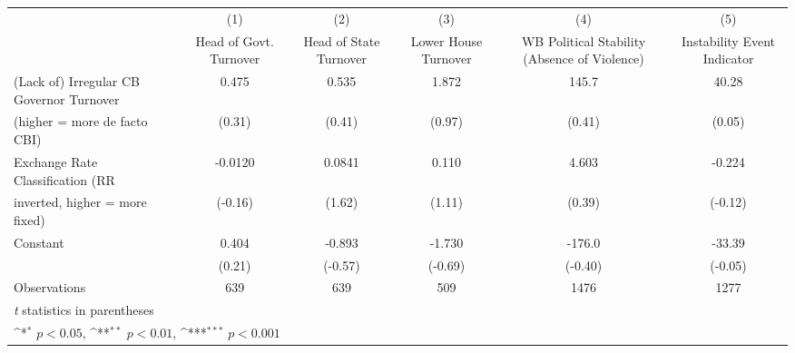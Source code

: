 {
\def\sym#1{\ifmmode^{#1}\else\(^{#1}\)\fi}
\begin{tabular}{l*{5}{c}}
\toprule
                                        &\multicolumn{1}{c}{(1)}&\multicolumn{1}{c}{(2)}&\multicolumn{1}{c}{(3)}&\multicolumn{1}{c}{(4)}&\multicolumn{1}{c}{(5)}\\
                                        &\multicolumn{1}{c}{Head of Govt. Turnover}&\multicolumn{1}{c}{Head of State Turnover}&\multicolumn{1}{c}{Lower House Turnover}&\multicolumn{1}{c}{WB Political Stability (Absence of Violence)}&\multicolumn{1}{c}{Instability Event Indicator}\\
\midrule
(Lack of) Irregular CB Governor Turnover&     0.475         &     0.535         &     1.872         &     145.7         &     40.28         \\
(higher = more de facto CBI)            &    (0.31)         &    (0.41)         &    (0.97)         &    (0.41)         &    (0.05)         \\
\addlinespace
Exchange Rate Classification (RR        &   -0.0120         &    0.0841         &     0.110         &     4.603         &    -0.224         \\
inverted, higher = more fixed)          &   (-0.16)         &    (1.62)         &    (1.11)         &    (0.39)         &   (-0.12)         \\
\addlinespace
Constant                                &     0.404         &    -0.893         &    -1.730         &    -176.0         &    -33.39         \\
                                        &    (0.21)         &   (-0.57)         &   (-0.69)         &   (-0.40)         &   (-0.05)         \\
\midrule
Observations                            &       639         &       639         &       509         &      1476         &      1277         \\
\bottomrule
\multicolumn{6}{l}{\footnotesize \textit{t} statistics in parentheses}\\
\multicolumn{6}{l}{\footnotesize \sym{*} \(p<0.05\), \sym{**} \(p<0.01\), \sym{***} \(p<0.001\)}\\
\end{tabular}
}

